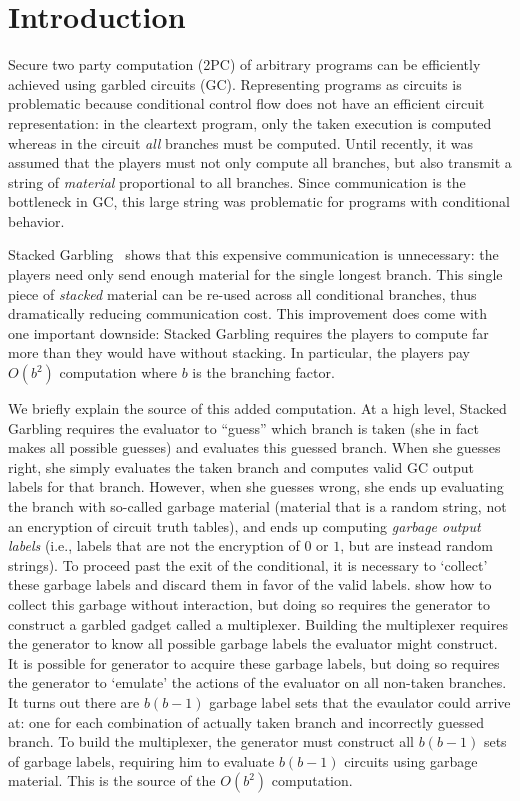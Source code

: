 \section{Introduction}\label{sec:intro}

Secure two party computation (2PC) of arbitrary programs can be
efficiently achieved using garbled circuits (GC).
%
Representing programs as circuits is problematic because conditional
control flow does not have an efficient circuit representation:
in the cleartext program, only the taken execution is computed whereas in
the circuit \emph{all} branches must be computed.
%
Until recently, it was assumed that the players must not only compute
all branches, but also transmit a string of \emph{material}
proportional to all branches.
Since communication is the bottleneck in GC, this large string was
problematic for programs with conditional behavior.

Stacked Garbling~\cite{EPRINT:HeaKol20b} shows that
this expensive communication is unnecessary: the players need only
send enough material for the single longest branch. This single
piece of \emph{stacked} material can be re-used across all conditional branches, thus
dramatically reducing communication cost.
%
This improvement does come with one important downside:
Stacked Garbling requires the players to compute far more than they
would have without stacking.
In particular, the players pay $O(b^2)$ computation where $b$ is the
branching factor.

We briefly explain the source of this added computation.
At a high level, Stacked Garbling requires the evaluator to
``guess'' which branch is taken (she in fact makes all possible
guesses) and evaluates this guessed branch.
When she guesses right, she simply evaluates the taken branch and
computes valid GC output labels for that branch.
However, when she guesses wrong, she ends up evaluating the branch
with so-called garbage material (material that is a random string, not
an encryption of circuit truth tables), and ends up computing
\emph{garbage output labels} (i.e., labels that are not the encryption
of $0$ or $1$, but are instead random strings).
%
To proceed past the exit of the conditional, it is necessary to
`collect' these garbage labels and discard them in favor of the valid
labels.
%
\cite{EPRINT:HeaKol20b} show how to collect this garbage without
interaction, but doing so requires the generator to construct a
garbled gadget called a multiplexer.
Building the multiplexer requires the generator to know all possible
garbage labels the evaluator might construct.
%
It is possible for generator to acquire these garbage labels, but
doing so requires the generator to `emulate' the actions of the
evaluator on all non-taken branches.
It turns out there are $b(b-1)$ garbage label sets that the evaulator
could arrive at: one for each combination of actually taken branch and
incorrectly guessed branch.
%
To build the multiplexer, the generator must construct all $b(b-1)$
sets of garbage labels, requiring him to evaluate $b(b-1)$ circuits
using garbage material.
This is the source of the $O(b^2)$ computation.

